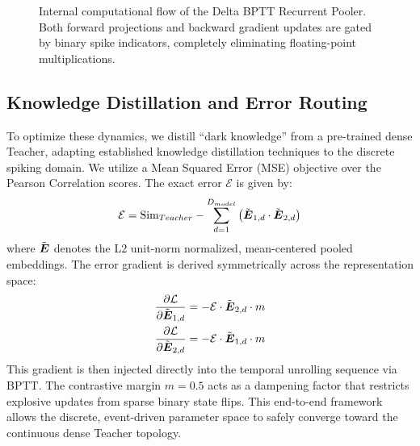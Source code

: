 \documentclass[11pt, conference, compsoc, twoside]{IEEEtran}
\begin{document}
\begin{figure}[t!]
\begin{center}
{%
}
\caption{Internal computational flow of the Delta BPTT Recurrent Pooler. Both forward projections and backward gradient updates are gated by binary spike indicators, completely eliminating floating-point multiplications.}
\label{fig:pooler_mech}
\end{center}
\end{figure}

\subsection{Knowledge Distillation and Error Routing}
To optimize these dynamics, we distill ``dark knowledge'' from a pre-trained dense Teacher, adapting established knowledge distillation techniques \cite{hinton2015distilling} to the discrete spiking domain. We utilize a Mean Squared Error (MSE) objective over the Pearson Correlation scores. The exact error $\mathcal{E}$ is given by:
\begin{equation}
\mathcal{E} = \text{Sim}_{Teacher} - \sum_{d=1}^{D_{model}} \left(\tilde{\boldsymbol{E}}_{1,d} \cdot \tilde{\boldsymbol{E}}_{2,d}\right)
\end{equation}
where $\tilde{\boldsymbol{E}}$ denotes the L2 unit-norm normalized, mean-centered pooled embeddings. The error gradient is derived symmetrically across the representation space:
\begin{align}
\frac{\partial \mathcal{L}}{\partial \tilde{\boldsymbol{E}}_{1,d}} &= -\mathcal{E} \cdot \tilde{\boldsymbol{E}}_{2,d} \cdot m \\
\frac{\partial \mathcal{L}}{\partial \tilde{\boldsymbol{E}}_{2,d}} &= -\mathcal{E} \cdot \tilde{\boldsymbol{E}}_{1,d} \cdot m
\end{align}
This gradient is then injected directly into the temporal unrolling sequence via BPTT. The contrastive margin $m=0.5$ acts as a dampening factor that restricts explosive updates from sparse binary state flips. This end-to-end framework allows the discrete, event-driven parameter space to safely converge toward the continuous dense Teacher topology.
\end{document}
